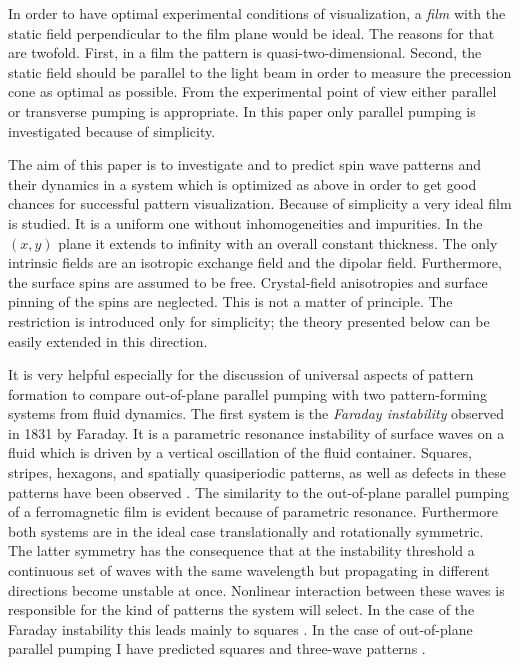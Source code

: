 In order to have optimal experimental conditions of visualization, a
{\em film\/} with the static field perpendicular to the film plane
would be ideal. The reasons for that are twofold. First, in a film
the pattern is quasi-two-dimensional. Second, the static field should
be parallel to the light beam in order to measure the precession cone
as optimal as possible. From the experimental point of view either
parallel or transverse pumping is appropriate. In this paper only
parallel pumping is investigated because of simplicity. 

The aim of this paper is to investigate and to predict spin wave
patterns and their dynamics in a system which is optimized as above
in order to get good chances for successful pattern visualization.
Because of simplicity a very ideal film is studied. It is a uniform
one without inhomogeneities and impurities. In the $(x,y)$ plane it
extends to infinity with an overall constant thickness. The only
intrinsic fields are an isotropic exchange field and the dipolar
field. Furthermore, the surface spins are assumed to be free. 
Crystal-field anisotropies and surface pinning of the spins are
neglected. This is not a matter of principle. The restriction is
introduced only for simplicity; the theory presented below can be
easily extended in this direction. 

It is very helpful especially for the discussion of universal aspects
of pattern formation to compare out-of-plane parallel pumping with
two pattern-forming systems from fluid dynamics. The first system is
the {\em Faraday instability\/} observed in 1831 by
Faraday\cite{far.31}. It is a parametric resonance instability of
surface waves on a fluid which is driven by a vertical oscillation of
the fluid container. Squares, stripes, hexagons, and spatially
quasiperiodic patterns, as well as defects in these patterns have
been observed \cite{cro.93}. The similarity to the out-of-plane
parallel pumping of a ferromagnetic film is evident because of
parametric resonance.  Furthermore both systems are in the ideal case
translationally and rotationally symmetric. The latter symmetry has
the consequence that at the instability threshold a continuous set of
waves with the same wavelength but propagating in different
directions become unstable at once. Nonlinear interaction between
these waves is responsible for the kind of patterns the system will
select. In the case of the Faraday instability this leads mainly to
squares \cite{mil.91}. In the case of out-of-plane parallel pumping I
have predicted squares and three-wave patterns \cite{elm.93}. 

